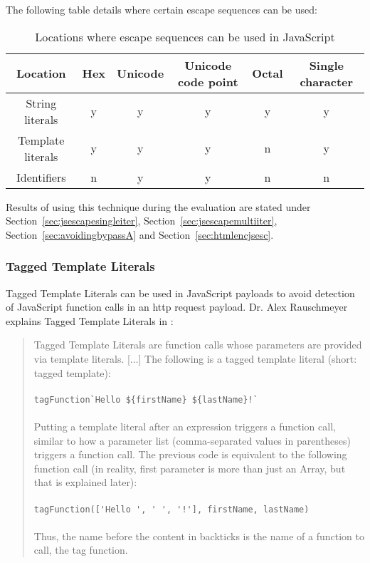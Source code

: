 The following table details where certain escape sequences can be used:

\begin{table}[h!]
	\centering
	\begin{tabular}{|c||c| c| c| c|c|}
		\hline
		Location          & Hex & Unicode & Unicode code point & Octal & Single character \\
		\hline\hline
		String literals   & y   & y       & y                  & y     & y                \\
		Template literals & y   & y       & y                  & n     & y                \\
		Identifiers       & n   & y       & y                  & n     & n                \\
		\hline
	\end{tabular}
	\caption{Locations where escape sequences can be used in JavaScript}
\end{table}
\cite{exploringes6/escapeseq,bynens/escape,js/lexicalgrammar}

Results of using this technique during the evaluation are stated under Section~\ref{sec:jsescapesingleiter}, Section~\ref{sec:jsescapemultiiter}, Section~\ref{sec:avoidingbypassA} and Section~\ref{sec:htmlencjsesc}.


\subsubsection{Tagged Template Literals}
\label{sec:taggedtemplateliterals}
Tagged Template Literals can be used in JavaScript payloads to avoid detection of JavaScript function calls in an \acrshort{http} request payload. Dr. Alex Rauschmeyer explains Tagged Template Literals in :
\begin{quotation} Tagged Template Literals are function calls whose parameters are provided via template literals. [...]
	The following is a tagged template literal (short: tagged template): \\\\
	\verb|tagFunction`Hello ${firstName} ${lastName}!`| \\\\
	Putting a template literal after an expression triggers a function call, similar to how a parameter list (comma-separated values in parentheses) triggers a function call. The previous code is equivalent to the following function call (in reality, first parameter is more than just an Array, but that is explained later): \\\\
	\verb|tagFunction(['Hello ', ' ', '!'], firstName, lastName)| \\\\
	Thus, the name before the content in backticks is the name of a function to call, the tag function.
	\cite{exploringes6/templatelit}
\end{quotation}

